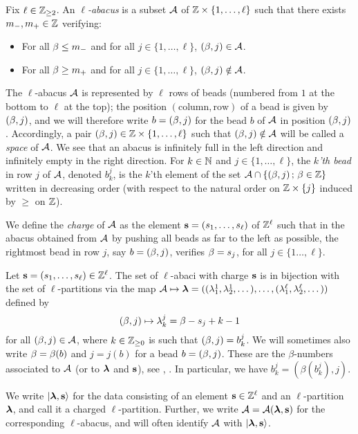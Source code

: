 \documentclass[12pt]{amsart}
\numberwithin{equation}{section}
\theoremstyle{definition}
\begin{document}
Fix $\ell\in\mathbb{Z}_{\geq2}$.
An \textit{%
$\ell$-abacus} is a subset $\mathcal{A}$ of $\mathbb{Z} \times \{ 1,\dots,\ell\}$
such that there exists $m_-,m_+\in\mathbb{Z}$ verifying:
\begin{itemize}
 \item For all $\beta\leq m_-$ and for all $j\in\{ 1,\dots,\ell\}$, $(\beta,j)\in\mathcal{A}$.
 \item For all $\beta\geq m_+$ and for all $j\in\{ 1,\dots,\ell\}$, $(\beta,j)\notin\mathcal{A}$.
\end{itemize}
The $\ell$-abacus $\mathcal{A}$ is represented by $\ell$ rows of beads (numbered from $1$ at the bottom to $\ell$ at the top);
the position $(\mathrm{column},\mathrm{row})$ of a bead is given by $(\beta,j)$,
and we will therefore write $b=(\beta,j)$ for the bead $b$ of $\mathcal{A}$ in position $(\beta,j)$.
Accordingly, a pair $(\beta,j)\in\mathbb{Z} \times \{ 1,\dots,\ell\}$ such that $(\beta,j)\notin\mathcal{A}$ will be called a \textit{space} of $\mathcal{A}$.
We see that an abacus is infinitely full in the left direction and infinitely empty in the right direction.
For $k\in\mathbb{N}$ and $j\in\{ 1,\dots,\ell\}$, the \textit{$k$'th bead} in row $j$ of $\mathcal{A}$, denoted $b_k^j$, is the $k$'th element of the
set $\mathcal{A}\cap\{ (\beta,j) \, ; \, \beta\in\mathbb{Z} \}$ written in decreasing order (with respect to the natural order on $\mathbb{Z}\times\{j\}$ induced by $\geq$ on $\mathbb{Z}$).

We define the \textit{charge} of $\mathcal{A}$ as the element $\mathbf{s}=(s_1,\dots,s_\ell)$ of $\mathbb{Z}^\ell$ such that 
in the abacus obtained from $\mathcal{A}$ by pushing all beads as far to the left as possible,
the rightmost bead in row $j$, say $b=(\beta,j)$, verifies $\beta=s_j$, for all $j\in\{1 \dots, \ell\}$.

Let $\mathbf{s}=(s_1,\dots,s_\ell)\in\mathbb{Z}^\ell$.
The set of $\ell$-abaci with charge $\mathbf{s}$ is in bijection with the set of $\ell$-partitions via the map
$\mathcal{A} \mapsto \boldsymbol{\lambda}=( (\lambda^1_1,\lambda^1_2,\dots), \dots, (\lambda^\ell_1,\lambda^\ell_2,\dots) )$ defined by 
$$(\beta,j) \mapsto \lambda_k^j=\beta-s_j+k-1$$
for all $(\beta,j)\in\mathcal{A}$, where $k\in\mathbb{Z}_{\geq0}$ is such that $(\beta,j)=b_k^j$.
We will sometimes also write $\beta=\beta(b)$ and $j=j(b)$ for a bead $b=(\beta,j)$. 
These are the $\beta$-numbers associated to $\mathcal{A}$ (or to $\boldsymbol{\lambda}$ and $\mathbf{s}$),
see \cite{James1978}, \cite{JamesKerber1984}. 
In particular, we have $b_k^j=(\beta(b_k^j),j)$.

We write $|\boldsymbol{\lambda},\mathbf{s}\rangle$ for the data consisting of an element $\mathbf{s}\in\mathbb{Z}^\ell$ and an $\ell$-partition $\boldsymbol{\lambda}$, 
and call it a charged $\ell$-partition.
Further, we write $\mathcal{A}=\mathcal{A}(\boldsymbol{\lambda},\mathbf{s})$ for the corresponding $\ell$-abacus,
and will often identify $\mathcal{A}$ with $|\boldsymbol{\lambda},\mathbf{s}\rangle$.
\end{document}

